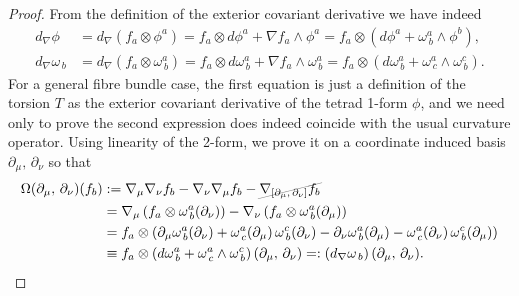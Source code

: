 \documentclass[../geometry_main.tex]{subfiles}
\begin{document}
\begin{proof}
From the definition of the exterior covariant derivative we have indeed
\begin{align}
    d_\nabla \phi &= d_\nabla (f_a \otimes \phi^a) = f_a \otimes d \phi^a  +  \nabla f_a \wedge \phi^a = f_a\otimes (d \phi^a + \omega^a_{\, b} \wedge \phi^b) ,
    \\
    d_\nabla \omega_{\, b} &= d_\nabla (f_a \otimes \omega^a_{\, b} ) = f_a\otimes d \omega^a_{\, b}  + \nabla f_a \wedge \omega^a_{\, b} = f_a\otimes (d \omega^a_{\, b} + \omega^a_{\, c} \wedge \omega^c_{\, b}).
\end{align}
For a general fibre bundle case, the first equation is just a definition of the torsion $T$ as the exterior covariant derivative of the tetrad 1-form $\phi$, and we need only to prove the second expression does indeed coincide with the usual curvature operator.
Using linearity of the 2-form, we prove it on a coordinate induced basis $\partial_\mu,\,\partial_\nu$ so that 
\begin{align}
    \Omega(\partial_\mu,\,\partial_\nu)(f_b)&:= \nabla_\mu \nabla_\nu f_b - \nabla_\nu \nabla_\mu f_b - \graycancel{\nabla_{[\partial_\mu,\,\partial_\nu]} f_b}
    \\
    &= \nabla_\mu \left( f_a \otimes \omega^a_{\, b}(\partial_\nu) \right) - \nabla_\nu \left( f_a \otimes \omega^a_{\, b}(\partial_\mu) \right)
    \\
    &= f_a \otimes \left( \partial_\mu \omega^a_{\, b}(\partial_\nu) + \omega^a_{\, c}(\partial_\mu) \, \omega^c_{\, b}(\partial_\nu) - \partial_\nu \omega^a_{\, b}(\partial_\mu) - \omega^a_{\, c}(\partial_\nu) \, \omega^c_{\, b}(\partial_\mu) \right)
    \\
    &\equiv f_a \otimes \left( d \omega^a_{\, b} + \omega^a_{\, c} \wedge \omega^c_{\, b} \right)(\partial_\mu,\,\partial_\nu) =: \left( d_\nabla \omega_{\, b} \right)(\partial_\mu,\,\partial_\nu).
\end{align}
%
\end{proof}
\end{document}
